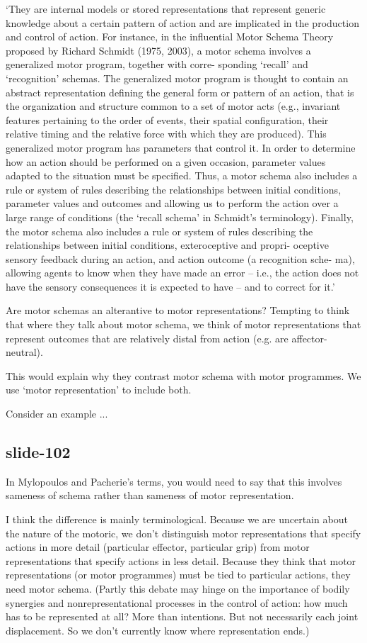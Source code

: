 \documentclass[12pt,\papersize]{extarticle}
\begin{document}
‘They are internal models or stored representations that represent generic knowledge
about a certain pattern of action and are implicated in the production and control of
action. For instance, in the influential Motor Schema Theory proposed by Richard Schmidt
(1975, 2003), a motor schema involves a generalized motor program, together with corre-
sponding ‘recall’ and ‘recognition’ schemas. The generalized motor program is thought to
contain an abstract representation defining the general form or pattern of an action,
that is the organization and structure common to a set of motor acts (e.g., invariant
features pertaining to the order of events, their spatial configuration, their relative
timing and the relative force with which they are produced). This generalized motor
program has parameters that control it. In order to determine how an action should be
performed on a given occasion, parameter values adapted to the situation must be
specified. Thus, a motor schema also includes a rule or system of rules describing the
relationships between initial conditions, parameter values and outcomes and allowing us
to perform the action over a large range of conditions (the ‘recall schema’ in Schmidt’s
terminology). Finally, the motor schema also includes a rule or system of rules
describing the relationships between initial conditions, exteroceptive and propri-
oceptive sensory feedback during an action, and action outcome (a recognition sche- ma),
allowing agents to know when they have made an error – i.e., the action does not have
the sensory consequences it is expected to have – and to correct for it.’

Are motor schemas an alterantive to motor representations? Tempting to think that where
they talk about motor schema, we think of motor representations that represent outcomes
that are relatively distal from action (e.g. are affector-neutral).

This would explain why they contrast motor schema with motor programmes. We use ‘motor
representation’ to include both.

Consider an example ...

\subsection{slide-102}
In Mylopoulos and Pacherie’s terms, you would need to say that this involves sameness of schema rather than sameness of motor representation.

I think the difference is mainly terminological.  Because we are uncertain about
the nature of the motoric, we don’t distinguish motor representations that
specify actions in more detail (particular effector, particular grip) from
motor representations that specify actions in less detail.
Because they think that motor representations (or motor programmes) must be tied to
particular actions, they need motor schema.
(Partly this debate may hinge on the importance of bodily synergies and
nonrepresentational processes in the control of action: how much has to be represented
at all? More than intentions. But not necessarily each joint displacement. So we don’t
currently know where representation ends.)
\end{document}
